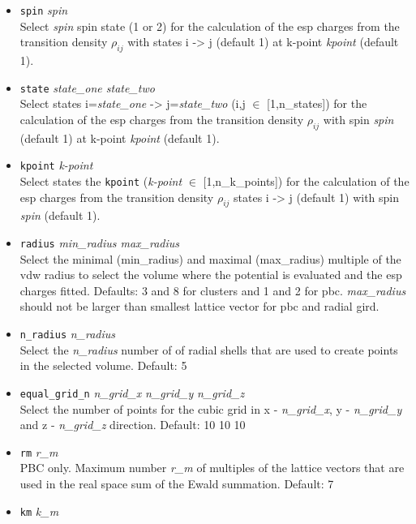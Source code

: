 \begin{itemize}
\item {} \texttt{spin} \textit{spin} \\
  Select \textit{spin} spin state (1 or 2) for the calculation of the esp charges from the transition density $\rho_{ij}$ with 
  states i -> j (default 1) at k-point \textit{kpoint} (default 1).
\item {} \texttt{state} \textit{state\_one state\_two} \\
  Select states i=\textit{state\_one} -> j=\textit{state\_two} (i,j $\in$ [1,n\_states]) for the calculation of the esp charges 
  from the transition density $\rho_{ij}$ with spin \textit{spin} (default 1) at k-point \textit{kpoint} (default 1).
\item {} \texttt{kpoint} \textit{k-point} \\
  Select states the \texttt{kpoint} (\textit{k-point} $\in$ [1,n\_k\_points]) for the calculation of the esp charges 
  from the transition density $\rho_{ij}$ states i -> j (default 1) with spin \textit{spin} (default 1).
\item {} \texttt{radius} \textit{min\_radius max\_radius} \\
  Select the minimal (min\_radius) and maximal (max\_radius) multiple of the vdw radius to select the volume where the 
  potential is evaluated and the esp charges fitted. Defaults: 3 and 8 for clusters and 1 and 2 for pbc. \textit{max\_radius} should not 
  be larger than smallest lattice vector for pbc and radial gird.
\item {} \texttt{n\_radius} \textit{n\_radius} \\
  Select the \textit{n\_radius} number of of radial shells that are used to create points in the selected volume. Default: 5
\item {} \texttt{equal\_grid\_n} \textit{n\_grid\_x} \textit{n\_grid\_y} \textit{n\_grid\_z}\\
  Select the number of points for the cubic grid in x - \textit{n\_grid\_x}, y -  \textit{n\_grid\_y} and z - \textit{n\_grid\_z} direction. Default: 10 10 10
\item {} \texttt{rm} \textit{r\_m} \\
  PBC only. Maximum number \textit{r\_m} of multiples of the lattice vectors that are used in the real space sum of the Ewald summation. 
  Default: 7
\item {} \texttt{km} \textit{k\_m} \\

\end{itemize}
